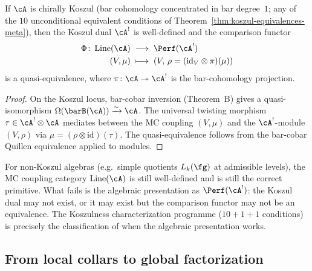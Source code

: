 \begin{theorem}
\label{thm:koszul-comparison-mc}
If $\cA$ is chirally Koszul
\textup{(}bar cohomology concentrated in bar degree~$1$;
any of the $10$ unconditional equivalent conditions of
Theorem~\textup{\ref{thm:koszul-equivalences-meta}}\textup{)},
then the Koszul dual $\cA^!$ is well-defined and the
comparison functor
\begin{align*}
  \Phi \colon \operatorname{Line}(\cA)
  &\;\longrightarrow\; \Perf(\cA^!) \\
  (V, \mu) &\;\longmapsto\;
  (V,\, \rho = (\mathrm{id}_V \otimes \pi)(\mu))
\end{align*}
is a quasi-equivalence, where
$\pi \colon \cA \twoheadrightarrow \cA^!$ is the bar-cohomology
projection.
\end{theorem}

\begin{proof}
On the Koszul locus, bar-cobar inversion
(Theorem~B) gives a quasi-isomorphism
$\Omega(\barB(\cA)) \xrightarrow{\sim} \cA$.  The universal
twisting morphism $\tau \in \cA^! \otimes \cA$ mediates between
the MC coupling $(V, \mu)$ and the $\cA^!$-module
$(V, \rho)$ via $\mu = (\rho \otimes \mathrm{id})(\tau)$.
The quasi-equivalence follows from the bar-cobar Quillen
equivalence applied to modules.
\end{proof}

\begin{remark}
\label{rem:off-koszul-locus}
For non-Koszul algebras \textup{(}e.g.\ simple quotients
$L_k(\fg)$ at admissible levels\textup{)}, the MC coupling category
$\operatorname{Line}(\cA)$ is still well-defined and is still the
correct primitive.  What fails is the algebraic presentation as
$\Perf(\cA^!)$: the Koszul dual may not exist, or it may exist
but the comparison functor may not be an equivalence.
The Koszulness characterization programme
\textup{(}$10{+}1{+}1$ conditions\textup{)} is precisely the
classification of when the algebraic presentation works.
\end{remark}

\subsection{From local collars to global factorization}
\label{subsec:local-to-global-factorization}

